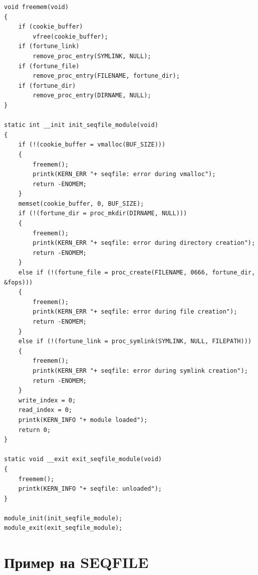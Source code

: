 \begin{lstlisting}
void freemem(void) 
{
	if (cookie_buffer)
		vfree(cookie_buffer);
	if (fortune_link)
		remove_proc_entry(SYMLINK, NULL);
	if (fortune_file)
		remove_proc_entry(FILENAME, fortune_dir);
	if (fortune_dir)
		remove_proc_entry(DIRNAME, NULL);
}

static int __init init_seqfile_module(void) 
{	
	if (!(cookie_buffer = vmalloc(BUF_SIZE))) 
	{
		freemem();
		printk(KERN_ERR "+ seqfile: error during vmalloc");
		return -ENOMEM;
	}
	memset(cookie_buffer, 0, BUF_SIZE);
	if (!(fortune_dir = proc_mkdir(DIRNAME, NULL))) 
	{
		freemem();
		printk(KERN_ERR "+ seqfile: error during directory creation");
		return -ENOMEM;
	} 
	else if (!(fortune_file = proc_create(FILENAME, 0666, fortune_dir, &fops))) 
	{
		freemem();
		printk(KERN_ERR "+ seqfile: error during file creation");
		return -ENOMEM;
	} 
	else if (!(fortune_link = proc_symlink(SYMLINK, NULL, FILEPATH))) 
	{
		freemem();
		printk(KERN_ERR "+ seqfile: error during symlink creation");
		return -ENOMEM;
	}
	write_index = 0;
	read_index = 0;
	printk(KERN_INFO "+ module loaded");
	return 0;
}

static void __exit exit_seqfile_module(void) 
{
	freemem();
	printk(KERN_INFO "+ seqfile: unloaded");
}

module_init(init_seqfile_module);
module_exit(exit_seqfile_module);

\end{lstlisting}

\section{Пример на SEQFILE}

